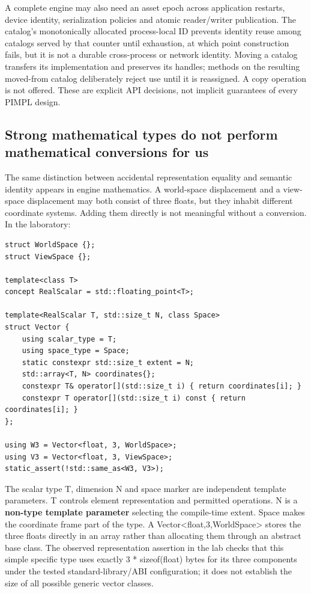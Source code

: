A complete engine may also need an asset epoch across application restarts, device identity, serialization policies and atomic reader/writer publication. The catalog's monotonically allocated process-local ID prevents identity reuse among catalogs served by that counter until exhaustion, at which point construction fails, but it is not a durable cross-process or network identity. Moving a catalog transfers its implementation and preserves its handles; methods on the resulting moved-from catalog deliberately reject use until it is reassigned. A copy operation is not offered. These are explicit API decisions, not implicit guarantees of every PIMPL design.

\subsection{Strong mathematical types do not perform mathematical conversions for us}\label{05-engine-i-ch007-strong-mathematical-types-do-not-perform-mathematical-conversions-for-us}

The same distinction between accidental representation equality and semantic identity appears in engine mathematics. A world-space displacement and a view-space displacement may both consist of three floats, but they inhabit different coordinate systems. Adding them directly is not meaningful without a conversion. In the laboratory:

\begin{verbatim}
struct WorldSpace {};
struct ViewSpace {};

template<class T>
concept RealScalar = std::floating_point<T>;

template<RealScalar T, std::size_t N, class Space>
struct Vector {
    using scalar_type = T;
    using space_type = Space;
    static constexpr std::size_t extent = N;
    std::array<T, N> coordinates{};
    constexpr T& operator[](std::size_t i) { return coordinates[i]; }
    constexpr T operator[](std::size_t i) const { return coordinates[i]; }
};

using W3 = Vector<float, 3, WorldSpace>;
using V3 = Vector<float, 3, ViewSpace>;
static_assert(!std::same_as<W3, V3>);
\end{verbatim}

The scalar type T, dimension N and space marker are independent template parameters. T controls element representation and permitted operations. N is a \textbf{non-type template parameter} selecting the compile-time extent. Space makes the coordinate frame part of the type. A Vector\textless float,3,WorldSpace\textgreater{} stores the three floats directly in an array rather than allocating them through an abstract base class. The observed representation assertion in the lab checks that this simple specific type uses exactly 3 * sizeof(float) bytes for its three components under the tested standard-library/ABI configuration; it does not establish the size of all possible generic vector classes.

